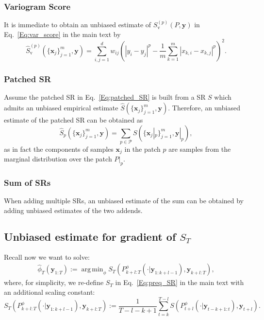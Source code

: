 \documentclass[twoside,11pt]{article}
\newcommand{\ddobs}{\mathbf{y}}
\newcommand{\ddobsupT}{\mathbf{y}_{1:T}}
\newcommand{\Sv}{S_{\operatorname{v}}}
\DeclareMathOperator*{\argmin}{arg\,min}
\begin{document}
	\subsubsection{Variogram Score} It is immediate to obtain an unbiased estimate of $\Sv^{(p)}(P, \ddobs) $ in Eq.~\eqref{Eq:var_score} in the main text by
	\begin{equation}\label{key}
	\hat \Sv^{(p)}(\{\mathbf x_j\}_{j=1}^m, \ddobs)=\sum_{i, j=1}^{d} w_{i j}\left(\left|y_{i}-y_{j}\right|^{p}-\frac{1}{m}\sum_{k=1}^m\left|x_{k,i}-x_{k,j}\right|^{p}\right)^{2}.
	\end{equation}
	
	\subsubsection{Patched SR}
	Assume the patched SR in Eq.~\eqref{Eq:patched_SR} is built from a SR $ S $ which admits an unbiased empirical estimate $ \hat S(\{\mathbf x_j\}_{j=1}^m, \ddobs) $. Therefore, an unbiased estimate of the patched SR can be obtained as
	\begin{equation}\label{}
	\hat S_{p}(\{\mathbf x_j\}_{j=1}^m, \ddobs) = \sum_{p \in \mathcal{P}} S(\{\mathbf x_j|_p\}_{j=1}^m, \ddobs|_p),
	\end{equation}
	as in fact the components of samples $ \mathbf x_j $ in the patch $ p $ are samples from the marginal distribution over the patch $ P|_p $.
	
	
	
	
	
	\subsubsection{Sum of SRs}	
	When adding multiple SRs, an unbiased estimate of the sum can be obtained by adding unbiased estimates of the two addends.
	
	
	
	\subsection{Unbiased estimate for gradient of $ S_T $}\label{app:unbiased_estimate_obj}
	
	
	Recall now we want to solve:	
	\begin{gather}\label{Eq:argmin_problem}
	\hat \phi_T(\ddobsupT) :=\argmin_\phi S_T (P^\phi_{k+l:T}(\cdot|\ddobs_{1:k+l-1}), \ddobs_{k+l:T}),
	\end{gather}
	where, for simplicity, we re-define $ S_T $ in Eq.~\eqref{Eq:preq_SR} in the main text with an additional scaling constant: 	
	\begin{equation}\label{Eq:preq}
	S_T (P^\phi_{k+l:T}(\cdot|\ddobs_{1:k+l-1}), \ddobs_{k+l:T}):=	\frac{1}{T-l-k+1}	\sum\limits_{t=k}^{T-l}S(P^\phi_{t+l}(\cdot|\ddobs_{t-k+1:t}),\ddobs_{t+l}).
	\end{equation}
	
\end{document}
